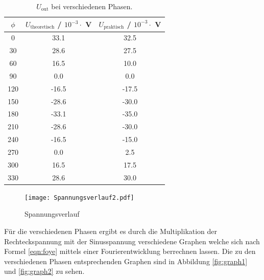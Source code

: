 \begin{table}
    \centering
    \begin{tabular}{c c c}
    	\toprule
    	$\phi$ & $U_{\text{theoretisch}}$ / $10^{-3} \cdot $ V & $U_{\text{praktisch}}$ / $10^{-3} \cdot $ V \\
    	\midrule
    	0   &  33.1  &  32.5        \\
    	30  &  28.6  &  27.5        \\
   	  60  &  16.5  &  10.0       \\
    	90  &  0.0   &   0.0        \\
    	120 & -16.5  & -17.5        \\
    	150 & -28.6  & -30.0        \\
    	180 & -33.1  & -35.0        \\
    	210 & -28.6  & -30.0        \\
    	240 & -16.5  & -15.0        \\
    	270 &  0.0   &  2.5         \\
    	300 &  16.5  &  17.5        \\
  	  330 &  28.6  &  30.0        \\
    	\end{tabular}
    \caption{$U_{\text{out}}$ bei verschiedenen Phasen.}
    \label{tab:Uphase2}
\end{table}

\begin{figure}
  \centering
  \texttt{[image: Spannungsverlauf2.pdf]}
  \caption{Spannungsverlauf}
  \label{fig:Spannungsverlauf}
\end{figure}

Für die verschiedenen Phasen ergibt es durch die Multiplikation der Rechteckspannung mit der Sinusspannung verschiedene Graphen welche sich nach Formel \ref{eqn:foye} mittels einer Fourierentwicklung berrechnen lassen. Die zu den verschiedenen Phasen entsprechenden Graphen sind in Abbildung \ref{fig:graph1} und \ref{fig:graph2} zu sehen.

